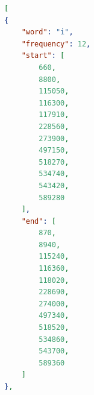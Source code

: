 \documentclass[12pt,a4paper,titlepage]{article}
\begin{document}
\begin{lstlisting}[language=json,firstnumber=1, caption=Formato JSON delle parole allineate, label=JSON_parole,captionpos=b]
[
{
	"word": "i",
	"frequency": 12,
	"start": [
		660,
		8800,
		115050,
		116300,
		117910,
		228560,
		273900,
		497150,
		518270,
		534740,
		543420,
		589280
	],
	"end": [
		870,
		8940,
		115240,
		116360,
		118020,
		228690,
		274000,
		497340,
		518520,
		534860,
		543700,
		589360
	]
},
\end{lstlisting}

\clearpage
\nocite{*}
\printbibliography
\end{document}
